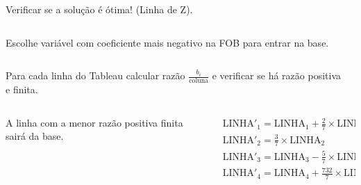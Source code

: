 \begin{frame}
	{
		\begin{columns}
			\begin{column}{5cm}
				\begin{mdframed}[backgroundcolor=olive!80]
					Verificar se a solução é ótima! (Linha de Z).
				\end{mdframed}
			\end{column}
			\begin{column}{5cm}

			\end{column}
		\end{columns}
	}	
	\only<7>
	{
		\begin{columns}
			\begin{column}{5cm}
				\begin{mdframed}[backgroundcolor=orange!80]
					Escolhe variável com coeficiente mais negativo na FOB para entrar na base.
				\end{mdframed}
			\end{column}
			\begin{column}{5cm}

			\end{column}
		\end{columns}
	}	
	\only<8>
	{
		\begin{columns}
			\begin{column}{5cm}
				\begin{mdframed}[backgroundcolor=olive!80]
					Para cada linha do Tableau calcular razão $\frac{b_i}{\text{coluna}}$ e verificar se há razão positiva e finita.
				\end{mdframed}
			\end{column}
			\begin{column}{5cm}

			\end{column}
		\end{columns}
	}	

	\only<9>
	{
		\begin{columns}
			\begin{column}{5cm}
				\begin{mdframed}[backgroundcolor=orange!80]
					A linha com a menor razão positiva finita sairá da base.
				\end{mdframed}
			\end{column}
			\begin{column}{5cm}
				$
					\begin{matrix}
						\scriptstyle \text{LINHA}'_1 = \text{LINHA}_1 + \frac{2}{7} \times \text{LINHA}_2\\
						\scriptstyle \text{LINHA}'_2 = \frac{3}{7} \times \text{LINHA}_2 \\
						\scriptstyle \text{LINHA}'_3 = \text{LINHA}_3 - \frac{5}{7} \times \text{LINHA}_2 \\
						\scriptstyle \text{LINHA}'_4 = \text{LINHA}_4 + \frac{732}{7} \times \text{LINHA}_2 \\
					\end{matrix}
				$
			\end{column}
		\end{columns}
	}	


\end{frame}
